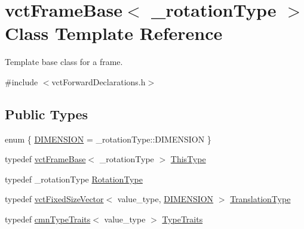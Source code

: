 \hypertarget{classvct_frame_base}{}\section{vct\+Frame\+Base$<$ \+\_\+rotation\+Type $>$ Class Template Reference}
\label{classvct_frame_base}


Template base class for a frame.  




{\ttfamily \#include $<$vct\+Forward\+Declarations.\+h$>$}

\subsection*{Public Types}
\begin{DoxyCompactItemize}
\item 
enum \{ \hyperlink{classvct_frame_base_a4284a4e875533c13df90a20c0233e043ad25b85efd5e4c2687ddf38ae18cd88f0}{D\+I\+M\+E\+N\+S\+I\+O\+N} = \+\_\+rotation\+Type\+:\+:D\+I\+M\+E\+N\+S\+I\+O\+N
 \}
\item 
typedef \hyperlink{classvct_frame_base}{vct\+Frame\+Base}$<$ \+\_\+rotation\+Type $>$ \hyperlink{classvct_frame_base_a076f1fe4fc957faa0d1ff7450d1cb768}{This\+Type}
\item 
typedef \+\_\+rotation\+Type \hyperlink{classvct_frame_base_a02e4eaad478400dd1d81e772caf3b01b}{Rotation\+Type}
\item 
typedef \hyperlink{classvct_fixed_size_vector}{vct\+Fixed\+Size\+Vector}$<$ value\+\_\+type, \hyperlink{classvct_frame_base_a4284a4e875533c13df90a20c0233e043ad25b85efd5e4c2687ddf38ae18cd88f0}{D\+I\+M\+E\+N\+S\+I\+O\+N} $>$ \hyperlink{classvct_frame_base_a4c397a93b65f0c38e75e99ff3a659c23}{Translation\+Type}
\item 
typedef \hyperlink{classcmn_type_traits}{cmn\+Type\+Traits}$<$ value\+\_\+type $>$ \hyperlink{classvct_frame_base_adfad078285c2712e6acd80fcbfbf5dec}{Type\+Traits}
\end{DoxyCompactItemize}
